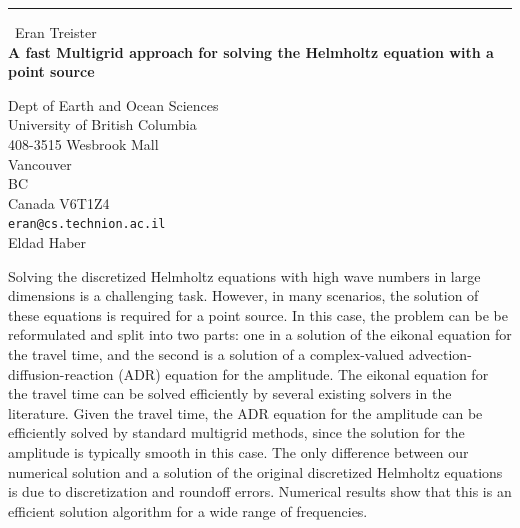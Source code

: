 \documentclass{report}
\begin{document}
\begin{center}
\rule{6in}{1pt} \
{\large Eran Treister \\
{\bf A fast Multigrid approach for solving the Helmholtz equation with a point source}}

Dept of Earth and Ocean Sciences \\ University of British Columbia \\ 408-3515 Wesbrook Mall \\ Vancouver \\ BC \\ Canada V6T1Z4
\\
{\tt eran@cs.technion.ac.il}\\
Eldad Haber\end{center}

Solving the discretized Helmholtz equations with high wave numbers in
large dimensions is a challenging task. However, in many scenarios, the
solution of these equations is required for a point source. In this case,
the problem can be be reformulated and split into two parts: one in a
solution of the eikonal equation for the travel time, and the second is a
solution of a complex-valued advection-diffusion-reaction (ADR) equation
for the amplitude. The eikonal equation for the travel time can be solved
efficiently by several existing solvers in the literature. Given the
travel time, the ADR equation for the amplitude can be efficiently solved
by standard multigrid methods, since the solution for the amplitude is
typically smooth in this case. The only difference between our numerical
solution and a solution of the original discretized Helmholtz equations
is due to discretization and roundoff errors. Numerical results show that
this is an efficient solution algorithm for a wide range of frequencies.
\end{document}
